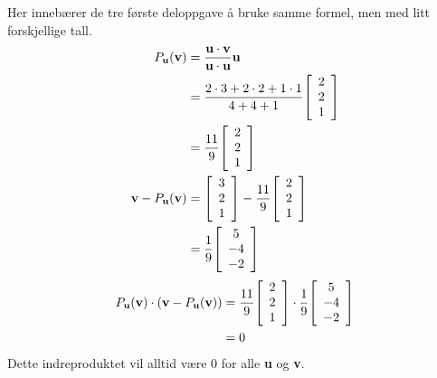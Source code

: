 \documentclass[11pt, a4paper, norsk]{NTNUoving}
\newenvironment{matrise}[1][c]{
        \left[
            \begin{array}{#1}
    }
    {    
    \end{array}
    \right]           
}
\begin{document}
\begin{oppgave}
    Her innebærer de tre første deloppgave å bruke samme formel, men med litt forskjellige tall.
    \begin{align*}
        P_\textbf{u}(\textbf{v})&= \frac{\textbf{u}\cdot \textbf{v}}{\textbf{u}\cdot \textbf{u}}\textbf{u}
        \\&=\frac{2\cdot 3+2\cdot 2+1\cdot 1}{4+4+1}\begin{matrise}
        2\\2\\1
        \end{matrise}
        \\&=\frac{11}{9}\begin{matrise}
        2\\2\\1
        \end{matrise}\\
        \textbf{v}- P_\textbf{u}(\textbf{v})&=\begin{matrise}
        3\\2\\1
        \end{matrise}-\frac{11}{9}\begin{matrise}
        2\\2\\1
        \end{matrise}
        \\&=\frac{1}{9}\begin{matrise}
        5\\-4\\-2
        \end{matrise}
    \end{align*}
    \begin{align*}
        P_\textbf{u}(\textbf{v})\cdot (\textbf{v}- P_\textbf{u}(\textbf{v})) &= \frac{11}{9}\begin{matrise}
        2\\2\\1
        \end{matrise} \cdot \frac{1}{9}\begin{matrise}
        5\\-4\\-2
        \end{matrise}
        \\&=0
    \end{align*}
    Dette indreproduktet vil alltid være 0 for alle \textbf{u} og \textbf{v}. 
\end{oppgave}
\end{document}
